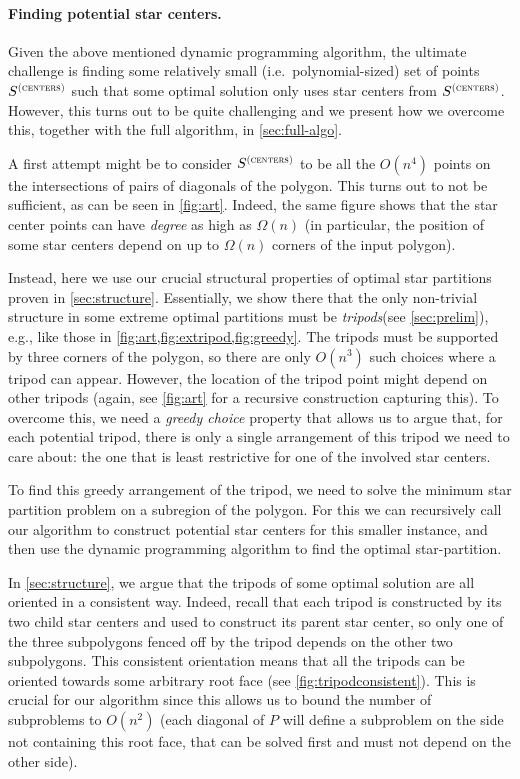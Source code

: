 \documentclass{theoretics}
\newcommand\Scen{S^{\textsc{(centers)}}}
\begin{document}
\paragraph{Finding potential star centers.} Given the above mentioned dynamic programming algorithm, the ultimate challenge is finding some relatively small (i.e.\ polynomial-sized) set of points $\Scen$ such that some optimal solution only uses star centers from $\Scen$. However, this turns out to be quite challenging and we present how we overcome this, together with the full algorithm, in \cref{sec:full-algo}.

A first attempt might be to consider $\Scen$ to be all the $O(n^4)$ points on the intersections of pairs of diagonals of the polygon. This turns out to not be sufficient, as can be seen in \cref{fig:art}. Indeed, the same figure shows that the star center points can have \emph{degree} as high as $\Omega(n)$ (in particular, the position of some star centers depend on up to $\Omega(n)$ corners of the input polygon).

Instead, here we use our crucial structural properties of optimal star partitions proven in \cref{sec:structure}. Essentially, we show there that the only non-trivial structure in some extreme optimal partitions must be \emph{tripods}(see \cref{sec:prelim}), e.g., like those in \cref{fig:art,fig:extripod,fig:greedy}. The tripods must be supported by three corners of the polygon, so there are only $O(n^3)$ such choices where a tripod can appear. However, the location of the tripod point might depend on other tripods (again, see \cref{fig:art} for a recursive construction capturing this). To overcome this, we need a \emph{greedy choice} property that allows us to argue that, for each potential tripod, there is only a single arrangement of this tripod we need to care about: the one that is least restrictive for one of the involved star centers.

To find this greedy arrangement of the tripod, we need to solve the minimum star partition problem on a subregion of the polygon. For this we can recursively call our algorithm to construct potential star centers for this smaller instance, and then use the dynamic programming algorithm to find the optimal star-partition. 

In \cref{sec:structure}, we argue that the tripods of some optimal solution are all oriented in a consistent way. Indeed, recall that each tripod is constructed by its two child star centers and used to construct its parent star center, so only one of the three subpolygons fenced off by the tripod depends on the other two subpolygons. This consistent orientation means that all the tripods can be oriented towards some arbitrary root face (see \cref{fig:tripodconsistent}). This is crucial for our algorithm since this allows us to bound the number of subproblems to $O(n^2)$ (each diagonal of $P$ will define a subproblem on the side not containing this root face, that can be solved first and must not depend on the other side).
\end{document}
